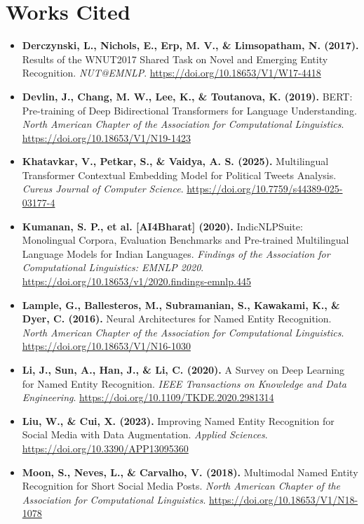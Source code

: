 \documentclass[12pt,a4paper]{article}
\begin{document}
\section{Works Cited}
\begin{itemize}
    \item \textbf{Derczynski, L., Nichols, E., Erp, M. V., \& Limsopatham, N. (2017).} Results of the WNUT2017 Shared Task on Novel and Emerging Entity Recognition. \textit{NUT@EMNLP}. \url{https://doi.org/10.18653/V1/W17-4418}

    \item \textbf{Devlin, J., Chang, M. W., Lee, K., \& Toutanova, K. (2019).} BERT: Pre-training of Deep Bidirectional Transformers for Language Understanding. \textit{North American Chapter of the Association for Computational Linguistics}. \url{https://doi.org/10.18653/V1/N19-1423}

    \item \textbf{Khatavkar, V., Petkar, S., \& Vaidya, A. S. (2025).} Multilingual Transformer Contextual Embedding Model for Political Tweets Analysis. \textit{Cureus Journal of Computer Science}. \url{https://doi.org/10.7759/s44389-025-03177-4}

    \item \textbf{Kumanan, S. P., et al. [AI4Bharat] (2020).} IndicNLPSuite: Monolingual Corpora, Evaluation Benchmarks and Pre-trained Multilingual Language Models for Indian Languages. \textit{Findings of the Association for Computational Linguistics: EMNLP 2020}. \url{https://doi.org/10.18653/v1/2020.findings-emnlp.445}

    \item \textbf{Lample, G., Ballesteros, M., Subramanian, S., Kawakami, K., \& Dyer, C. (2016).} Neural Architectures for Named Entity Recognition. \textit{North American Chapter of the Association for Computational Linguistics}. \url{https://doi.org/10.18653/V1/N16-1030}

    \item \textbf{Li, J., Sun, A., Han, J., \& Li, C. (2020).} A Survey on Deep Learning for Named Entity Recognition. \textit{IEEE Transactions on Knowledge and Data Engineering}. \url{https://doi.org/10.1109/TKDE.2020.2981314}

    \item \textbf{Liu, W., \& Cui, X. (2023).} Improving Named Entity Recognition for Social Media with Data Augmentation. \textit{Applied Sciences}. \url{https://doi.org/10.3390/APP13095360}

    \item \textbf{Moon, S., Neves, L., \& Carvalho, V. (2018).} Multimodal Named Entity Recognition for Short Social Media Posts. \textit{North American Chapter of the Association for Computational Linguistics}. \url{https://doi.org/10.18653/V1/N18-1078}


\end{itemize}
\end{document}
